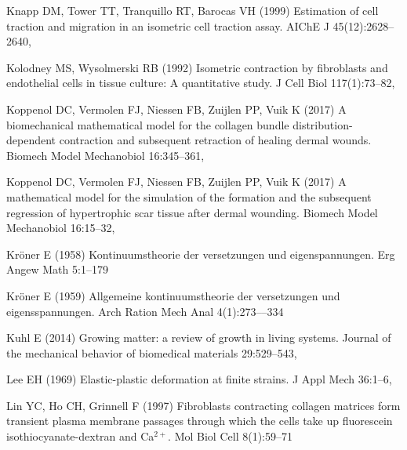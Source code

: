 \begin{thebibliography}{124}
Knapp DM, Tower TT, Tranquillo RT, Barocas VH (1999) Estimation of cell
  traction and migration in an isometric cell traction assay. AIChE J
  45(12):2628--2640, 

Kolodney MS, Wysolmerski RB (1992) Isometric contraction by fibroblasts and
  endothelial cells in tissue culture: {A} quantitative study. J Cell Biol
  117(1):73--82, 

Koppenol DC, Vermolen FJ, Niessen FB, Zuijlen PP, Vuik K (2017{}) A
  biomechanical mathematical model for the collagen bundle
  distribution-dependent contraction and subsequent retraction of healing
  dermal wounds. Biomech Model Mechanobiol 16:345--361,

Koppenol DC, Vermolen FJ, Niessen FB, Zuijlen PP, Vuik K (2017{}) A
  mathematical model for the simulation of the formation and the subsequent
  regression of hypertrophic scar tissue after dermal wounding. Biomech Model
  Mechanobiol 16:15--32, 

Kr{\"o}ner E (1958) Kontinuumstheorie der versetzungen und eigenspannungen. Erg
  Angew Math 5:1--179

Kr{\"o}ner E (1959) Allgemeine kontinuumstheorie der versetzungen und
  eigensspannungen. Arch Ration Mech Anal 4(1):273–--334

Kuhl E (2014) Growing matter: a review of growth in living systems. Journal of
  the mechanical behavior of biomedical materials 29:529--543,

Lee EH (1969) Elastic-plastic deformation at finite strains. J Appl Mech
  36:1--6, 

Lin YC, Ho CH, Grinnell F (1997) Fibroblasts contracting collagen matrices form
  transient plasma membrane passages through which the cells take up
  fluorescein isothiocyanate-dextran and {Ca}$^{2+}$. Mol Biol Cell 8(1):59--71


\end{thebibliography}
